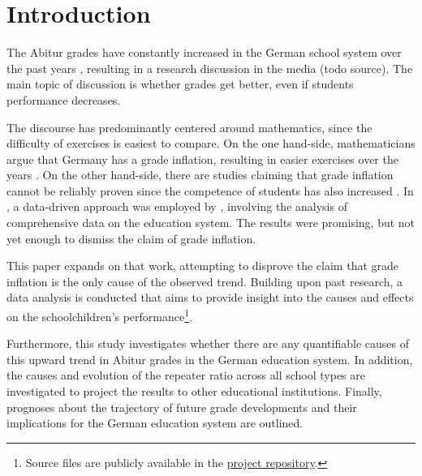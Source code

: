 \section{Introduction} \label{sec:Introduction}
The Abitur grades have constantly increased in the German school system over the past years \cite{kultusminister_konferenz_abiturnoten_nodate}, resulting in a research discussion in the media (todo source). The main topic of discussion is whether grades get better, even if students performance decreases.

The discourse has predominantly centered around mathematics, since the difficulty of exercises is easiest to compare. On the one hand-side, mathematicians argue that Germany has a grade inflation, resulting in easier exercises over the years \cite{kuhnel_modellierungskompetenz_2015, jahnke_hamburger_2014,lemmermeyer_zentralabitur_nodate}. On the other hand-side, there are studies claiming that grade inflation cannot be reliably proven since the competence of students has also increased \cite{schleithoff_noteninflation_2015}. In \citeyear{grozinger_gibt_2015}, a data-driven approach was employed by \citeauthor{grozinger_gibt_2015}, involving the analysis of comprehensive data on the education system. The results were promising, but not yet enough to dismiss the claim of grade inflation.

This paper expands on that work, attempting to disprove the claim that grade inflation is the only cause of the observed trend. Building upon past research, a data analysis is conducted that aims to provide insight into the causes and effects on the schoolchildren's performance\footnote{Source files are publicly available in the \href{https://github.com/KarylReyne/DataLiteracyWS23}{project repository}.}.

Furthermore, this study investigates whether there are any quantifiable causes of this upward trend in Abitur grades in the German education system. In addition, the causes and evolution of the repeater ratio across all school types are investigated to project the results to other educational institutions. Finally, prognoses about the trajectory of future grade developments and their implications for the German education system are outlined.